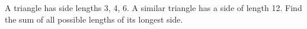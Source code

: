 A triangle has side lengths 3, 4, 6. A similar triangle has a side of length 12. Find the sum of all possible lengths of its longest side.

